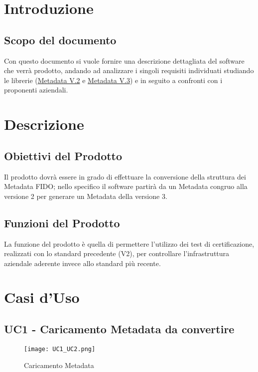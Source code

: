 \chapter{Introduzione}
    \section{Scopo del documento}
Con questo documento si vuole fornire una descrizione dettagliata del software che verrà prodotto, andando ad analizzare i singoli requisiti individuati studiando le librerie (\href{https://fidoalliance.org/specs/fido-v2.0-rd-20180702/fido-metadata-statement-v2.0-rd-20180702.html}{Metadata V.2} e \href{https://fidoalliance.org/specs/mds/fido-metadata-statement-v3.0-ps-20210518.html}{Metadata V.3}) e in seguito a confronti con i proponenti aziendali.

\chapter{Descrizione}
    \section{Obiettivi del Prodotto}
    Il prodotto dovrà essere in grado di effettuare la conversione della struttura dei Metadata FIDO; nello specifico il software partirà da un Metadata congruo alla versione 2 per generare un Metadata della versione 3.
    
    \section{Funzioni del Prodotto}
    La funzione del prodotto è quella di permettere l'utilizzo dei test di certificazione, realizzati con lo standard precedente (V2), per controllare l'infrastruttura aziendale aderente invece allo standard più recente.
\chapter{Casi d'Uso}
    \section{UC1 - Caricamento Metadata da convertire}
    \begin{figure}[ht]
        \centering
        \texttt{[image: UC1\_UC2.png]}
        \caption{Caricamento Metadata}
    \end{figure}

